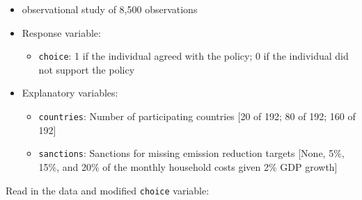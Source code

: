 \documentclass[12pt,letterpaper]{article}
\begin{document}
\begin{itemize}
  \item observational study of 8,500 observations
	\item Response variable: 
	\begin{itemize}
		\item \texttt{choice}: 1 if the individual agreed with the policy; 0 if the individual did not support the policy
	\end{itemize}
	\item Explanatory variables: 
	\begin{itemize}
		\item
		\texttt{countries}: Number of participating countries [20 of 192; 80 of 192; 160 of 192]
		\item
		\texttt{sanctions}: Sanctions for missing emission reduction targets [None, 5\%, 15\%, and 20\% of the monthly household costs given 2\% GDP growth]
		
	\end{itemize}
	
\end{itemize}

  Read in the data and modified \texttt{choice} variable:
  
\end{document}
